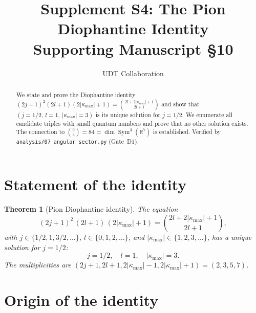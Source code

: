 \documentclass[11pt,letterpaper]{article}
\title{Supplement S4: The Pion Diophantine Identity \\
\large Supporting Manuscript \S10}
\author{UDT Collaboration}
\date{}
\newtheorem{theorem}{Theorem}[section]
\numberwithin{equation}{section}
\begin{document}
\maketitle

\begin{abstract}
We state and prove the Diophantine identity
$(2j+1)^2(2l+1)(2|\kappa_\mathrm{max}|+1) = \binom{2l+2|\kappa_\mathrm{max}|+1}{2l+1}$
and show that $(j=1/2,\, l=1,\, |\kappa_\mathrm{max}|=3)$ is its unique
solution for $j = 1/2$. We enumerate all candidate triples with small
quantum numbers and prove that no other solution exists. The connection
to $\binom{9}{3} = 84 = \dim\operatorname{Sym}^3(\mathbb{R}^7)$ is
established. Verified by \texttt{analysis/07\_angular\_sector.py}
(Gate~D1).
\end{abstract}

\tableofcontents

\section{Statement of the identity}
\label{sec:statement}

\begin{theorem}[Pion Diophantine identity]
\label{thm:diophantine}
The equation
\begin{equation}
\label{eq:diophantine}
\boxed{
  (2j+1)^2\,(2l+1)\,(2|\kappa_\mathrm{max}|+1)
  = \binom{2l + 2|\kappa_\mathrm{max}| + 1}{\; 2l+1 \;},
}
\end{equation}
with $j \in \{1/2, 1, 3/2, \ldots\}$, $l \in \{0, 1, 2, \ldots\}$, and
$|\kappa_\mathrm{max}| \in \{1, 2, 3, \ldots\}$, has a unique solution
for $j = 1/2$:
\begin{equation}
\label{eq:solution}
  j = 1/2, \quad l = 1, \quad |\kappa_\mathrm{max}| = 3.
\end{equation}
The multiplicities are $(2j+1, 2l+1, 2|\kappa_\mathrm{max}|-1, 2|\kappa_\mathrm{max}|+1) = (2, 3, 5, 7)$.
\end{theorem}

\section{Origin of the identity}
\label{sec:origin}
\end{document}
